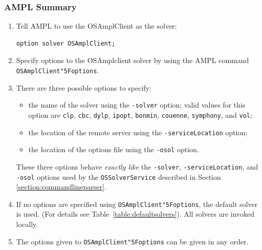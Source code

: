 \documentclass[11pt]{article}
\renewcommand{\_}{{\char"5F}}
\renewcommand{\{}{{\char"7B}}
\renewcommand{\}}{{\char"7D}}
\renewcommand{\^}{{\char"0D}}
\renewcommand{\'}{{\char"0D}}
\begin{document}
\begin{enumerate}[Step 1:]
\subsubsection{AMPL Summary}

\begin{enumerate}
\item Tell  AMPL to use the OSAmplClient as the solver:

\begin{verbatim}
option solver OSAmplClient;
\end{verbatim}

\item Specify options to the OSAmplclient solver by using the AMPL command {\tt OSAmplClient\_options}.

\item There are three possible options to specify:

\begin{itemize}

\item the name of the solver using the  {\tt -solver} option; valid values for this option  are {\tt clp}, 
{\tt cbc},  {\tt dylp},  {\tt ipopt}, {\tt bonmin},   {\tt couenne},  {\tt symphony}, and {\tt vol};


\item the location of the remote server using   the {\tt -serviceLocation} option;

\item the location of the options file using  the {\tt -osol} option.

\end{itemize}

These three options behave {\it exactly like} the {\tt -solver}, {\tt -serviceLocation}, and {\tt -osol} options used by the {\tt OSSolverService} described in  Section \ref{section:commandlineparser}.


\item If no options are specified using {\tt OSAmplClient\_options},  the default solver is used.
(For details see Table~\ref{table:defaultsolvers}).
%
%
All solvers are invoked locally. 

\item  The options given to {\tt OSAmplClient\_options}  can be given in any order.


\end{enumerate}
\end{enumerate}
\end{document}
